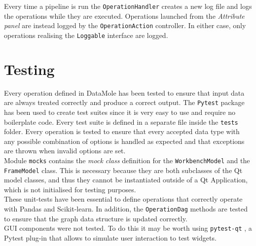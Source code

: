 Every time a pipeline is run the \texttt{OperationHandler} creates a new log file and logs the operations while they are executed. Operations launched from the \textit{Attribute panel} are instead logged by the \texttt{OperationAction} controller. In either case, only operations realising the \texttt{Loggable} interface are logged.

\section{Testing}
Every operation defined in DataMole has been tested to ensure that input data are always treated correctly and produce a correct output. The \texttt{Pytest} package has been used to create test suites since it is very easy to use and require no boilerplate code. Every test suite is defined in a separate file inside the \texttt{tests} folder. Every operation is tested to ensure that every accepted data type with any possible combination of options is handled as expected and that exceptions are thrown when invalid options are set.\\
Module \texttt{mocks} contains the \textit{mock class} definition for the \texttt{WorkbenchModel} and the \texttt{FrameModel} class. This is necessary because they are both subclasses of the Qt model classes, and thus they cannot be instantiated outside of a Qt Application, which is not initialised for testing purposes.\\
These unit-tests have been essential to define operations that correctly operate with Pandas and Scikit-learn. In addition, the \texttt{OperationDag} methods are tested to ensure that the graph data structure is updated correctly.\\
GUI components were not tested. To do this it may be worth using \texttt{pytest-qt} \cite{sw:pytest-qt}, a Pytest plug-in that allows to simulate user interaction to test widgets.




